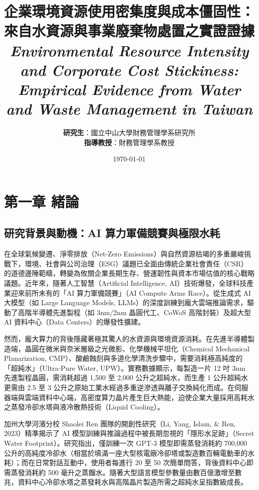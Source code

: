 \documentclass[12pt,a4paper]{article}
\title{\textbf{企業環境資源使用密集度與成本僵固性：\\來自水資源與事業廢棄物處置之實證證據}\\
\large\textit{Environmental Resource Intensity and Corporate Cost Stickiness:\\Empirical Evidence from Water and Waste Management in Taiwan}}
\author{\textbf{研究生}：國立中山大學財務管理學系研究所\\
\textbf{指導教授}：財務管理學系教授}
\date{\today}
\begin{document}
\maketitle
\newpage

\tableofcontents
\newpage

\listoftables
\newpage

\section{第一章 緒論}

\subsection{研究背景與動機：AI 算力軍備競賽與極限水耗}

在全球氣候變遷、淨零排放（Net-Zero Emissions）與自然資源枯竭的多重嚴峻挑戰下，環境、社會與公司治理（ESG）議題已全面由傳統企業社會責任（CSR）的道德邊陲範疇，轉變為攸關企業長期生存、營運韌性與資本市場估值的核心戰略議題。近年來，隨著人工智慧（Artificial Intelligence, AI）技術爆發，全球科技產業迎來前所未有的「AI 算力軍備競賽」（AI Compute Arms Race）。從生成式 AI 大模型（如 Large Language Models, LLMs）的深度訓練到龐大雲端推論需求，驅動了高階半導體先進製程（如 3nm/2nm 晶圓代工、CoWoS 高階封裝）及超大型 AI 資料中心（Data Centers）的爆發性擴建。

然而，龐大算力的背後隱藏著極其驚人的水資源與環境資源消耗。在先進半導體製造端，晶圓在微米與奈米層級之光微影、化學機械平坦化（Chemical Mechanical Planarization, CMP）、酸鹼蝕刻與多道化學清洗步驟中，需要消耗極高純度的「超純水」（Ultra-Pure Water, UPW）。實務數據顯示，每製造一片 12 吋 3nm 先進製程晶圓，需消耗超過 1,500 至 2,000 公升之超純水，而生產 1 公升超純水更需由 2.5 至 3 公升之原始工業水經過多重逆滲透與離子交換純化而成。在伺服器端與雲端資料中心端，高密度算力晶片產生巨大熱能，迫使企業大量採用高耗水之蒸發冷卻水塔與液冷散熱技術（Liquid Cooling）。

加州大學河濱分校 Shaolei Ren 團隊的開創性研究（Li, Yang, Islam, \& Ren, 2023）精準揭示了 AI 模型訓練與推論過程中被長期忽視的「隱形水足跡」（Secret Water Footprint）。研究指出，僅訓練一次 GPT-3 模型即需蒸發消耗約 700,000 公升的高純度冷卻水（相當於填滿一座大型核電廠冷卻塔或製造數百輛電動車的水耗）；而在日常對話互動中，使用者每進行 20 至 50 次簡單問答，背後資料中心即需蒸發消耗約 500 毫升之蒸餾水。隨著大型語言模型參數量由數百億激增至數兆，資料中心冷卻水塔之蒸發耗水與高階晶片製造所需之超純水呈指數級成長。
\end{document}

